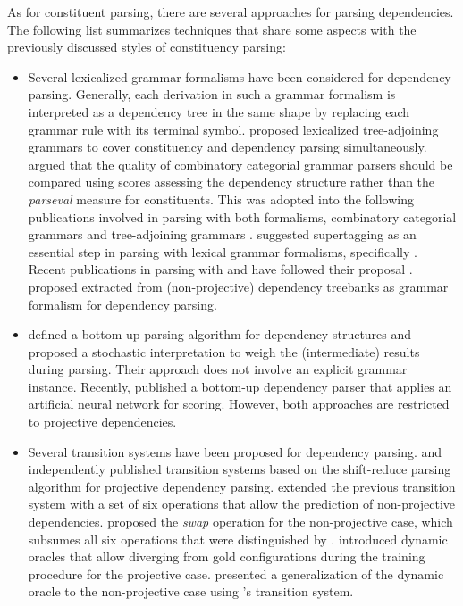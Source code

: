 \documentclass[../document.tex]{subfiles}
\begin{document}
    As for constituent parsing, there are several approaches for parsing dependencies.
    The following list summarizes techniques that share some aspects with the previously discussed styles of constituency parsing:
    \begin{itemize}
        \item Several lexicalized grammar formalisms have been considered for dependency parsing.
            Generally, each derivation in such a grammar formalism is interpreted as a dependency tree in the same shape by replacing each grammar rule with its terminal symbol.
             proposed lexicalized tree-adjoining grammars to cover constituency and dependency parsing simultaneously.
             argued that the quality of combinatory categorial grammar parsers should be compared using scores assessing the dependency structure rather than the \emph{parseval} measure for constituents.
            This was adopted into the following publications involved in parsing with both formalisms, combinatory categorial grammars and tree-adjoining grammars \citep{Kas17,Bla18}.
             suggested supertagging as an essential step in parsing with lexical grammar formalisms, specifically .
            Recent publications in parsing with  and  have followed their proposal \citep{Kas17,LewisSteedman14}.
             proposed  extracted from (non-projective) dependency treebanks as grammar formalism for dependency parsing.
        \item {} defined a bottom-up parsing algorithm for dependency structures and proposed a stochastic interpretation to weigh the (intermediate) results during parsing.
            Their approach does not involve an explicit grammar instance.
            Recently, \citet{yang-tu-2022-headed} published a bottom-up dependency parser that applies an artificial neural network for scoring.
            However, both approaches are restricted to projective dependencies.
        \item Several transition systems have been proposed for dependency parsing.
             and \citet{yamada-matsumoto-2003-statistical} independently published transition systems based on the shift-reduce parsing algorithm for projective dependency parsing.
             extended the previous transition system with a set of six operations that allow the prediction of non-projective dependencies.
             proposed the \emph{swap} operation for the non-projective case, which subsumes all six operations that were distinguished by \citeauthor{attardi-2006-experiments}.
             introduced dynamic oracles that allow diverging from gold configurations during the training procedure for the projective case.
             presented a generalization of the dynamic oracle to the non-projective case using \citeauthor{attardi-2006-experiments}'s transition system.
    \end{itemize}
\end{document}
